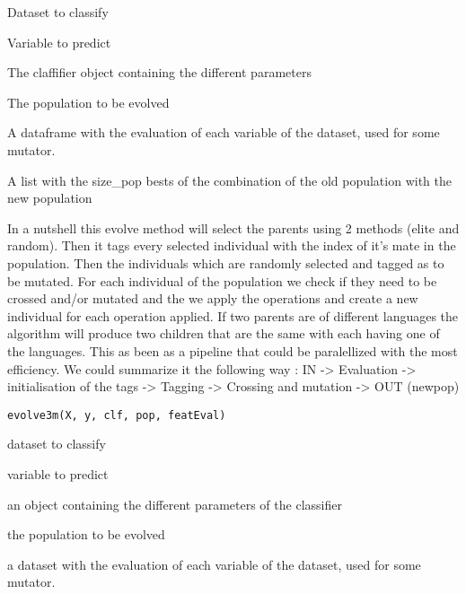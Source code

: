 \documentclass[a4paper]{book}
\begin{document}
%
\begin{Arguments}
\begin{ldescription}
\item[\code{X:}] Dataset to classify

\item[\code{y:}] Variable to predict

\item[\code{clf:}] The claffifier  object containing the different parameters

\item[\code{pop:}] The population to be evolved

\item[\code{featEval:}] A dataframe with the evaluation of each variable of the dataset, 
used for some mutator.
\end{ldescription}
\end{Arguments}
%
\begin{Value}
A list with the size\_pop bests of the combination of the old population 
with the new population
\end{Value}
%
\begin{Description}
In a nutshell this evolve method will select the parents using 2 methods (elite and random).
Then it tags every selected individual with the index of it's mate in the population. 
Then the individuals which are randomly selected and tagged as to be mutated. For each individual of the 
population we check if they need to be crossed and/or mutated and the we apply the operations and 
create a new individual for each operation applied. If two parents are of different languages the algorithm 
will produce two children that are the same with each having one of the languages.
This as been as a pipeline that could be paralellized with the most efficiency. We could summarize it the following way : 
IN -> Evaluation -> initialisation of the tags -> Tagging -> Crossing and mutation -> OUT (newpop)
\end{Description}
%
\begin{Usage}
\begin{verbatim}
evolve3m(X, y, clf, pop, featEval)
\end{verbatim}
\end{Usage}
%
\begin{Arguments}
\begin{ldescription}
\item[\code{X:}] dataset to classify

\item[\code{y:}] variable to predict

\item[\code{clf:}] an object containing the different parameters of the classifier

\item[\code{pop:}] the population to be evolved

\item[\code{featEval:}] a dataset with the evaluation of each variable of the dataset, used for some mutator.
\end{ldescription}
\end{Arguments}
\end{document}

